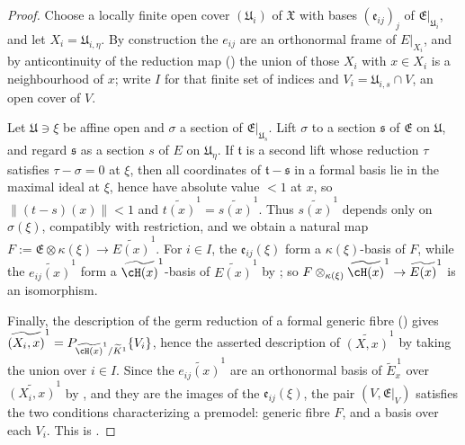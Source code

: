 \begin{proof}
Choose a locally finite open cover $(\mathfrak U_i)$ of $\mathfrak X$
with bases $(\mathfrak e_{ij})_j$ of $\mathfrak E|_{\mathfrak U_i}$, and
let $X_i=\mathfrak U_{i,\eta}$.  By construction the $e_{ij}$ are an
orthonormal frame of $E|_{X_i}$, and by anticontinuity of the reduction
map () the union of those $X_i$
with $x\in X_i$ is a neighbourhood of $x$; write $I$ for that finite
set of indices and $V_i=\mathfrak U_{i,s}\cap V$, an open cover of $V$.

Let $\mathfrak U\ni\xi$ be affine open and $\sigma$ a section of
$\mathfrak E|_{\mathfrak U_s}$.  Lift $\sigma$ to a section
$\mathfrak s$ of $\mathfrak E$ on $\mathfrak U$, and regard
$\mathfrak s$ as a section $s$ of $E$ on $\mathfrak U_\eta$.  If
$\mathfrak t$ is a second lift whose reduction $\tau$ satisfies
$\tau-\sigma=0$ at $\xi$, then all coordinates of
$\mathfrak t-\mathfrak s$ in a formal basis lie in the maximal ideal at
$\xi$, hence have absolute value $<1$ at $x$, so
$\|(t-s)(x)\|<1$ and $\widetilde{t(x)}^{1}=\widetilde{s(x)}^{1}$.  Thus
$\widetilde{s(x)}^{1}$ depends only on $\sigma(\xi)$, compatibly with
restriction, and we obtain a natural map
$F:=\mathfrak E\otimes\kappa(\xi)\to\widetilde{E(x)}^{1}$.  For
$i\in I$, the $\mathfrak e_{ij}(\xi)$ form a $\kappa(\xi)$-basis of
$F$, while the $\widetilde{e_{ij}(x)}^{1}$ form a
$\widetilde{\cH(x)}^1$-basis of $\widetilde{E(x)}^{1}$ by
; so
$F\otimes_{\kappa(\xi)}\widetilde{\cH(x)}^1\to\widetilde{E(x)}^{1}$ is an
isomorphism.

Finally, the description of the germ reduction of a formal generic fibre
() gives
$\widetilde{(X_i,x)}^1=P_{\widetilde{\cH(x)}^1/\widetilde K^1}\{V_i\}$,
hence the asserted description of $\widetilde{(X,x)}^1$ by taking the
union over $i\in I$.  Since the $\widetilde{e_{ij}(x)}^1$ are an
orthonormal basis of $\widetilde E_x^{\,1}$ over
$\widetilde{(X_i,x)}^1$ by
, and they are the images of the
$\mathfrak e_{ij}(\xi)$, the pair $(V,\mathfrak E|_V)$ satisfies the two
conditions characterizing a premodel: generic fibre $F$, and a basis over
each $V_i$.  This is \cite[Lemma~17.7.10]{CLD25}.
\end{proof}

